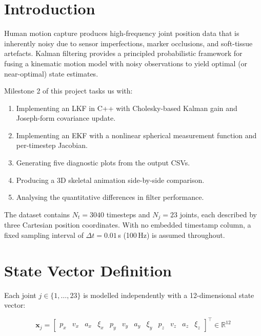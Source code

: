 \documentclass[12pt, a4paper]{article}
\begin{document}
\section{Introduction}

Human motion capture produces high-frequency joint position data that is inherently noisy due to sensor imperfections, marker occlusions, and soft-tissue artefacts. Kalman filtering provides a principled probabilistic framework for fusing a kinematic motion model with noisy observations to yield optimal (or near-optimal) state estimates.

Milestone 2 of this project tasks us with:
\begin{enumerate}[noitemsep]
  \item Implementing an LKF in C++ with Cholesky-based Kalman gain and Joseph-form covariance update.
  \item Implementing an EKF with a nonlinear spherical measurement function and per-timestep Jacobian.
  \item Generating five diagnostic plots from the output CSVs.
  \item Producing a 3D skeletal animation side-by-side comparison.
  \item Analysing the quantitative differences in filter performance.
\end{enumerate}

The dataset contains $N_t = 3040$ timesteps and $N_j = 23$ joints, each described by three Cartesian position coordinates. With no embedded timestamp column, a fixed sampling interval of $\Delta t = 0.01\,$s (100\,Hz) is assumed throughout.

\section{State Vector Definition}

Each joint $j \in \{1,\ldots,23\}$ is modelled independently with a 12-dimensional state vector:

\begin{equation}
\mathbf{x}_j = \begin{bmatrix}
p_x & v_x & a_x & \xi_x &
p_y & v_y & a_y & \xi_y &
p_z & v_z & a_z & \xi_z
\end{bmatrix}^\top \in \mathbb{R}^{12}
\label{eq:state}
\end{equation}
\end{document}
